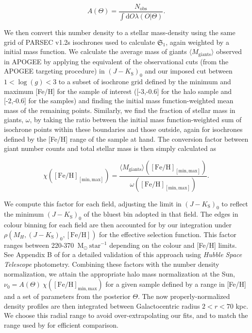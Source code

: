 \begin{equation}
\label{eq:density-normalization}
A(\Theta) = \frac{ N_\mathrm{obs} }{ \int \mathrm{d}O \lambda(O \vert \Theta) }.
\end{equation}

We then convert this number density to a stellar mass-density using the same grid of PARSEC v1.2s isochrones \parencite{bressan12} used to calculate $\mathfrak{S}_{1}$, again weighted by a \textcite{chabrier03} initial mass function. We calculate the average mass of giants $\langle M_{\mathrm{giants}} \rangle$ observed in APOGEE by applying the equivalent of the observational cuts (from the APOGEE targeting procedure) in $(J-K_\mathrm{S})_0$ and our imposed cut between $1 < \log(g) < 3$ to a subset of isochrone grid defined by the minimum and maximum [Fe/H] for the sample of interest ([-3,-0.6] for the halo sample and [-2,-0.6] for the \gse samples) and finding the initial mass function-weighted mean mass of the remaining points. Similarly, we find the fraction of stellar mass in giants, $\omega$, by taking the ratio between the initial mass function-weighted sum of isochrone points within these boundaries and those outside, again for isochrones defined by the [Fe/H] range of the sample at hand. The conversion factor between giant number counts and total stellar mass is then simply calculated as 

\begin{equation}
\label{eq:isochrone-factors}
\chi \left( \mathrm{[Fe/H]_\mathrm{[min,max]}} \right) = \frac{\langle M_{\mathrm{giants}} \rangle \left( \mathrm{[Fe/H]}_\mathrm{[min,max]} \right) }{\omega \left( \mathrm{[Fe/H]}_{\mathrm{[min,max]}} \right) }.
\end{equation}

We compute this factor for each field, adjusting the limit in $(J-K_\mathrm{S})_0$ to reflect the minimum $(J-K_\mathrm{S})_0$ of the bluest bin adopted in that field. The edges in colour binning for each field are then accounted for by our integration under $\rho(M_{H},(J-K_\mathrm{S})_0,\mathrm{[Fe/H]})$ for the effective selection function. This factor ranges between 220-370~$\mathrm{M}_{\odot}~\mathrm{star}^{-1}$ depending on the colour and [Fe/H] limits. See Appendix B of \cite{mackereth20} for a detailed validation of this approach using \textit{Hubble Space Telescope} photometry. Combining these factors with the number density normalization, we attain the appropriate halo mass normalization at the Sun, $\nu_{0} = A(\Theta)~ \chi \left( \mathrm{[Fe/H]_\mathrm{min,max}} \right)$ for a given sample defined by a range in [Fe/H] and a set of parameters from the posterior $\Theta$. The now properly-normalized density profiles are then integrated between Galactocentric radius $2 < r < 70$ kpc. We choose this radial range to avoid over-extrapolating our fits, and to match the range used by \cite{mackereth20} for efficient comparison. 

